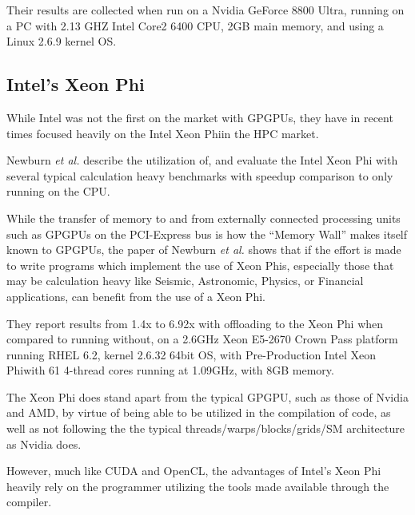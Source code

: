 Their results are collected when run on a Nvidia GeForce 8800 Ultra, running on a PC with 2.13 GHZ Intel Core2 6400 CPU, 2GB main memory, and using a Linux 2.6.9 kernel OS.

\subsection{Intel's Xeon Phi}

While Intel was not the first on the market with GPGPUs, they have in recent times focused heavily on the Intel Xeon Phi\texttrademark in the HPC market.

Newburn \textit{et al.}\cite{Newburn:2013:OCR:2510648.2511038} describe the utilization of, and evaluate the Intel Xeon Phi with several typical calculation heavy benchmarks with speedup comparison to only running on the CPU.

While the transfer of memory to and from externally connected processing units such as GPGPUs on the PCI-Express bus is how the ``Memory Wall'' makes itself known to GPGPUs,
the paper of Newburn \textit{et al.}\cite{Newburn:2013:OCR:2510648.2511038} shows that if the effort is made to write programs which implement the use of Xeon Phis, especially those that may be calculation heavy like Seismic, Astronomic, Physics, or Financial applications, can benefit from the use of a Xeon Phi.

They report results from 1.4x to 6.92x with offloading to the Xeon Phi when compared to running without, on a 2.6GHz Xeon E5-2670 Crown Pass platform running RHEL 6.2, kernel 2.6.32 64bit OS, with Pre-Production Intel Xeon Phi\texttrademark with 61 4-thread cores running at 1.09GHz, with 8GB memory.

The Xeon Phi does stand apart from the typical GPGPU, such as those of Nvidia and AMD, by virtue of being able to be utilized in the compilation of code, as well as not following the the typical threads/warps/blocks/grids/SM architecture as Nvidia does.

However, much like CUDA and OpenCL, the advantages of Intel's Xeon Phi heavily rely on the programmer utilizing the tools made available through the compiler.
